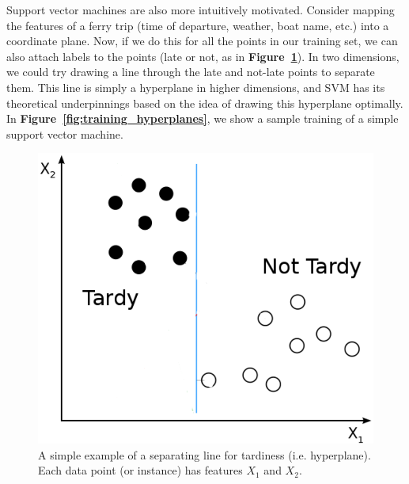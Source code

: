 \documentclass[11pt]{article} %
\begin{document}
Support vector machines are also more intuitively motivated. Consider mapping the
features of a ferry trip (time of departure, weather, boat name, etc.) into a
coordinate plane.  Now, if we do this for all the points in our training set,
we can also attach labels to the points (late or not, as in 
\textbf{Figure~\ref{fig:basic_svm_data}}). In two dimensions, we
could try drawing a line through the late and not-late points to separate them.
This line is simply a hyperplane in higher dimensions, and SVM has its theoretical
underpinnings based on the idea of drawing this hyperplane optimally. In 
\textbf{Figure~\ref{fig:training_hyperplanes}}, we show a sample training of a 
simple support vector machine.

\begin{figure}[h]
  \centering
  \includegraphics[scale=.5]{images/basic_svm_data.png}
  \caption{A simple example of a separating line for tardiness (i.e. hyperplane). 
      Each data point (or instance) has features $X_1$ and $X_2$.}
  \label{fig:basic_svm_data}
\end{figure}
\end{document}
